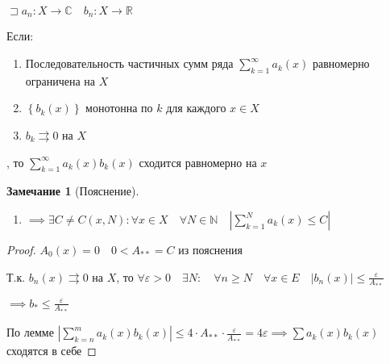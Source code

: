 \documentclass{book}
\newcommand\N{\ensuremath{\mathbb{N}}}
\newcommand\R{\ensuremath{\mathbb{R}}}
\renewcommand\C{\ensuremath{\mathbb{C}}}
\theoremstyle{definition}
\newtheorem*{note}{Замечание}
\begin{document}
    \begin{theorem}

        $\sqsupset a_n: X\to \C\quad b_n: X\to \R$

        Если:
        \begin{enumerate}
            \item Последовательность частичных сумм ряда $\sum_{k=1}^{\infty } a_k(x)$ равномерно ограничена на $X$
            \item  $\left\{ b_k(x) \right\} $ монотонна по $k$ для каждого  $x\in X$
            \item  $b_k\rightrightarrows 0$ на  $X$
        \end{enumerate}

        , то $\sum_{k=1}^{\infty } a_k(x)b_k(x)$ сходится равномерно на $x$
    \end{theorem}
    \begin{note}
        [Пояснение]
         \begin{enumerate}
             \item $\implies \exists C \neq  C(x,N): \forall x\in X\quad \forall N\in \N \quad \left| \sum_{k=1}^{N} a_k(x)\leqslant C \right| $
        \end{enumerate}
    \end{note}
    \begin{proof}
        $A_0(x) = 0\quad 0<A_{* *} =C$ из пояснения

        Т.к. $b_n(x) \rightrightarrows 0$ на $X$, то  $\forall \varepsilon>0\quad \exists N: \quad \forall n\geqslant N\quad \forall x\in E\quad |b_n(x)|\leqslant \frac{\varepsilon}{A_{* *}}$ 

        $\implies b_* \leqslant \frac{\varepsilon}{A_{* *}}$ 

        По лемме $\left| \sum_{k=n}^{m} a_k(x)b_k(x) \right| \leqslant 4 \cdot  A_{* *}\cdot \frac{\varepsilon}{A_{* *}} = 4\varepsilon \implies\sum a_k(x) b_k(x)$ сходятся в себе 
    \end{proof}
\end{document}
